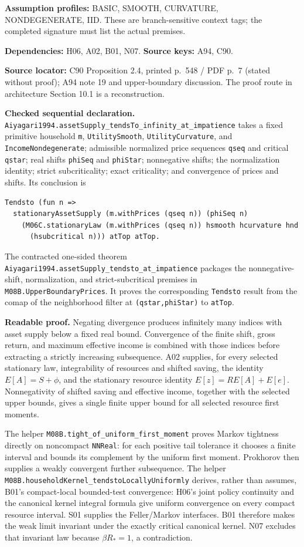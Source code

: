 \documentclass[
  11pt,
]{article}
\let\LedgerOriginalTexttt\texttt
\renewcommand{\texttt}[1]{{\small\LedgerOriginalTexttt{#1}}}
\begin{document}
\textbf{Assumption profiles:} BASIC, SMOOTH, CURVATURE, NONDEGENERATE,
IID. These are branch-sensitive context tags; the completed signature
must list the actual premises.

\textbf{Dependencies:} H06, A02, B01, N07. \textbf{Source keys:} A94,
C90.

\textbf{Source locator:} C90 Proposition 2.4, printed p.~548 / PDF p.~7
(stated without proof); A94 note 19 and upper-boundary discussion. The
proof route in architecture Section 10.1 is a reconstruction.

\textbf{Checked sequential declaration.}
\texttt{Aiyagari1994.assetSupply\_tendsTo\_infinity\_at\_impatience}
takes a fixed primitive household \texttt{m}, \texttt{UtilitySmooth},
\texttt{UtilityCurvature}, and \texttt{IncomeNondegenerate}; admissible
normalized price sequences \texttt{qseq} and critical \texttt{qstar};
real shifts \texttt{phiSeq} and \texttt{phiStar}; nonnegative shifts;
the normalization identity; strict subcriticality; exact criticality;
and convergence of prices and shifts. Its conclusion is

\begin{verbatim}
Tendsto (fun n =>
  stationaryAssetSupply (m.withPrices (qseq n)) (phiSeq n)
    (M06C.stationaryLaw (m.withPrices (qseq n)) hsmooth hcurvature hnd
      (hsubcritical n))) atTop atTop.
\end{verbatim}

The contracted one-sided theorem
\texttt{Aiyagari1994.assetSupply\_tendsto\_at\_impatience} packages the
nonnegative-shift, normalization, and strict-subcritical premises in
\texttt{M08B.UpperBoundaryPrices}. It proves the corresponding
\texttt{Tendsto} result from the comap of the neighborhood filter at
\texttt{(qstar,phiStar)} to \texttt{atTop}.

\textbf{Readable proof.} Negating divergence produces infinitely many
indices with asset supply below a fixed real bound. Convergence of the
finite shift, gross return, and maximum effective income is combined
with those indices before extracting a strictly increasing subsequence.
A02 supplies, for every selected stationary law, integrability of
resources and shifted saving, the identity \(E[A]=S+\phi\), and the
stationary resource identity \(E[z]=R E[A]+E[e]\). Nonnegativity of
shifted saving and effective income, together with the selected upper
bounds, gives a single finite upper bound for all selected resource
first moments.

The helper \texttt{M08B.tight\_of\_uniform\_first\_moment} proves Markov
tightness directly on noncompact \texttt{NNReal}: for each positive tail
tolerance it chooses a finite interval and bounds its complement by the
uniform first moment. Prokhorov then supplies a weakly convergent
further subsequence. The helper
\texttt{M08B.householdKernel\_tendstoLocallyUniformly} derives, rather
than assumes, B01's compact-local bounded-test convergence: H06's joint
policy continuity and the canonical kernel integral formula give uniform
convergence on every compact resource interval. S01 supplies the
Feller/Markov interfaces. B01 therefore makes the weak limit invariant
under the exactly critical canonical kernel. N07 excludes that invariant
law because \(\beta R_*=1\), a contradiction.
\end{document}
